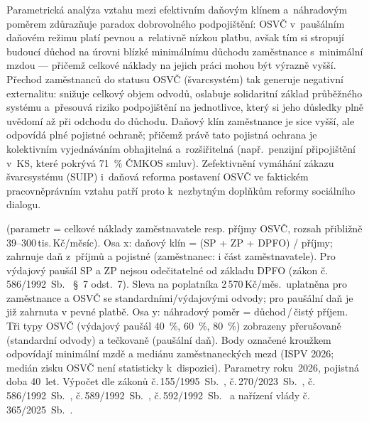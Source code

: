 Parametrická analýza vztahu mezi efektivním daňovým klínem a~náhradovým poměrem zdůrazňuje paradox dobrovolného podpojištění: \ac{OSVČ} v~paušálním daňovém režimu platí pevnou a~relativně nízkou platbu, avšak tím si stropují budoucí důchod na úrovni blízké minimálnímu důchodu zaměstnance s~minimální mzdou --- přičemž celkové náklady na jejich práci mohou být výrazně vyšší.
Přechod zaměstnanců do statusu \ac{OSVČ} (švarcsystém) tak generuje negativní externalitu: snižuje celkový objem odvodů, oslabuje solidaritní základ průběžného systému a~přesouvá riziko podpojištění na jednotlivce, který si jeho důsledky plně uvědomí až při odchodu do důchodu.
Daňový klín zaměstnance je sice vyšší, ale odpovídá plné pojistné ochraně; přičemž právě tato pojistná ochrana je kolektivním vyjednáváním obhajitelná a~rozšiřitelná (např.\ penzijní připojištění v~\ac{KS}, které pokrývá \SI{71}{\percent} \ac{ČMKOS} smluv).
Zefektivnění vymáhání zákazu švarcsystému (\ac{SUIP}) i~daňová reforma postavení \ac{OSVČ} ve faktickém pracovněprávním vztahu patří proto k~nezbytným doplňkům reformy sociálního dialogu.

 (parametr = celkové náklady zaměstnavatele resp. příjmy \ac{OSVČ}, rozsah přibližně 39–300\,tis.\,Kč/měsíc). Osa x: daňový klín = (\ac{SP} + \ac{ZP} + DPFO) / příjmy; zahrnuje daň z~příjmů a pojistné (zaměstnanec: i část zaměstnavatele). Pro výdajový paušál \ac{SP} a \ac{ZP} nejsou odečitatelné od základu DPFO (zákon č.\,586/1992~Sb.~\cite{zakon_zdp_1992} §~7 odst.~7). Sleva na poplatníka 2\,570\,Kč/měs.\ uplatněna pro zaměstnance a \ac{OSVČ} se standardními/výdajovými odvody; pro paušální daň je již zahrnuta v pevné platbě. Osa y: náhradový poměr = důchod\,/\,čistý příjem. Tři typy \ac{OSVČ} (výdajový paušál \SI{40}{\percent}, \SI{60}{\percent}, \SI{80}{\percent}) zobrazeny přerušovaně (standardní odvody) a tečkovaně (paušální daň). Body označené kroužkem odpovídají minimální mzdě a mediánu zaměstnaneckých mezd (\ac{ISPV} 2026; medián zisku \ac{OSVČ} není statisticky k~dispozici). Parametry roku~2026, pojistná doba 40~let. Výpočet dle zákonů č.\,155/1995~Sb.~\cite{zakon_zpds_1995}, č.\,270/2023~Sb.~\cite{zakon_duchreforma_2023}, č.\,586/1992~Sb.~\cite{zakon_zdp_1992}, č.\,589/1992~Sb.~\cite{zakon_sp_1992}, č.\,592/1992~Sb.~\cite{zakon_zp_1992} a nařízení vlády č.\,365/2025~Sb.~\cite{nv_365_2025}.
